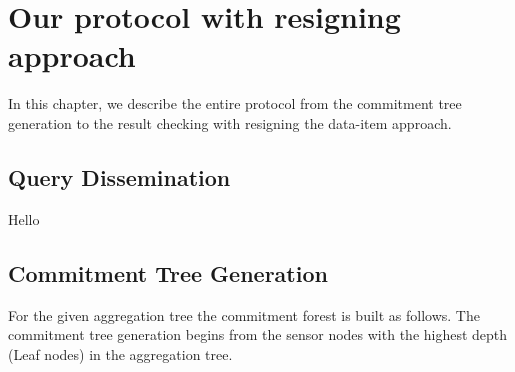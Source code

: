 \chapter{Our protocol with resigning approach }
	In this chapter, we describe the entire protocol from the commitment tree generation to the result checking with resigning the data-item approach.

\section{Query Dissemination}
	Hello
\section{Commitment Tree Generation}
	For the given aggregation tree the commitment forest is built as follows.
	The commitment tree generation begins from the sensor nodes with the highest depth (Leaf nodes) in the aggregation tree.

